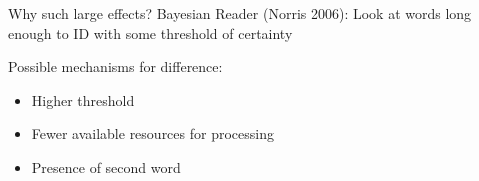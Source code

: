 \documentclass[ 12pt, xcolor=beamer,table,usenames,dvipsnames, ignorenonframetext, ngerman]{beamer}
\begin{document}
\begin{frame}{Why such large effects?}
	Bayesian Reader (Norris 2006): Look at words long enough to ID with some threshold of certainty 
	
	
	Possible mechanisms for difference: 
	\begin{itemize}
		\item Higher threshold 
		\item Fewer available resources for processing
		\item Presence of second word 
	\end{itemize}
	
\end{frame}
\end{document}
